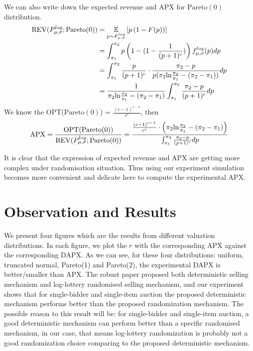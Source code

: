 We can also write down the expected revenue and APX for $\text{Pareto}(0)$ distribution.
\begin{equation}\notag
\begin{split}	
	\text{REV}(P^{log}_{\mu,\sigma} ;\text{Pareto}(0)) &=\underset{p \sim F^{log}_{\mu,\sigma} }{\mathbb{E}}\left[ p\left(1-F(p)\right)\right] \\ &= \int_{\pi_1}^{\pi_2} p\left(1 -  (1-\frac{1}{(p+1)^c})\right)f^{log}_{\mu,\sigma}(p)dp \\&=\int_{\pi_1}^{\pi_2} \frac{p}{(p+1)^c}\cdot \frac{\pi_2 -p}{p(\pi_2 \text{ln}\frac{\pi_2}{\pi_1} - (\pi_2-\pi_1))} dp \\&=  \frac{1}{\pi_2 \text{ln}\frac{\pi_2}{\pi_1} - (\pi_2-\pi_1)}\int_{\pi_1}^{\pi_2} \frac{\pi_2 - p}{(p+1)^c}dp 
\end{split}
\end{equation} 
We know the OPT($\text{Pareto}(0)$) = $\frac{(c-1)^{c-1}}{c^c}$, then
\begin{equation}\notag
    \text{APX} = \frac{\text{OPT}(\text{Pareto}(0))}{\text{REV}(P^{log}_{\mu,\sigma} ;\text{Pareto}(0))} = \frac{\frac{(c-1)^{c-1}}{c^c}\cdot \left(\pi_2 \text{ln}\frac{\pi_2}{\pi_1} - (\pi_2-\pi_1)\right)}{ \int_{\pi_1}^{\pi_2} \frac{\pi_2 - p}{(p+1)^c}dp  }
\end{equation}

It is clear that the expression of expected revenue and APX are getting more complex under randomisation situation. Thus using our experiment simulation becomes more convenient and delicate here to compute the experimental APX. 

\section{Observation and Results}
We present four figures which are the results from different valuation distributions. In each figure, we plot the $r$ with the corresponding APX against the corresponding DAPX. As we can see, for these four distributions: uniform, truncated normal, Pareto(1) and Pareto(2), the experimental DAPX is better/smaller than APX. The robust paper proposed both deterministic selling mechanism and log-lottery randomised selling mechanism, and our experiment shows that for single-bidder and single-item auction the proposed deterministic mechanism performs better than the proposed randomization mechanism. The possible reason to this result will be: for single-bidder and single-item auction, a good deterministic mechanism can perform better than a specific randomised mechanism, in our case, that means log-lottery randomization is probably not a good randomization choice comparing to the proposed deterministic mechanism. 


